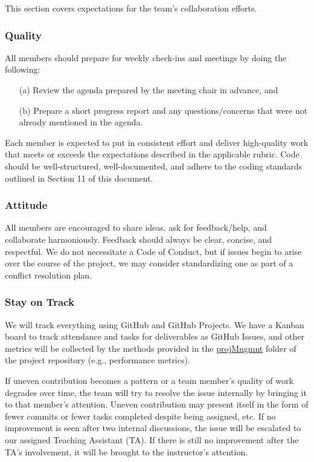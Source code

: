 \documentclass{article}
\begin{document}
This section covers expectations for the team's collaboration efforts.

\subsubsection*{Quality} 

All members should prepare for weekly check-ins and meetings by doing the following:

\begin{itemize}
  \item[(a)] Review the agenda prepared by the meeting chair in advance, and
  \item[(b)] Prepare a short progress report and any questions/concerns that were not
  already mentioned in the agenda.
\end{itemize}

\noindent Each member is expected to put in consistent effort and deliver high-quality work
that meets or exceeds the expectations described in the applicable rubric. Code
should be well-structured, well-documented, and adhere to the coding standards
outlined in Section 11 of this document.

\subsubsection*{Attitude}

All members are encouraged to share ideas, ask for feedback/help, and collaborate
harmoniously. Feedback should always be clear, concise, and respectful. We do not
necessitate a Code of Conduct, but if issues begin to arise over the course of the
project, we may consider standardizing one as part of a conflict resolution plan.

\subsubsection*{Stay on Track}

We will track everything using GitHub and GitHub Projects. We have a Kanban board to
track attendance and tasks for deliverables as GitHub Issues, and other
metrics will be collected by the methods provided in the \href{https://github.com/SumanyaG/Alkalytics/tree/main/docs/projMngmnt}{projMngmnt}
folder of the project repository (e.g., performance metrics).\newline

\noindent If uneven contribution becomes a pattern or a team member’s quality of work degrades
over time, the team will try to resolve the issue internally by bringing it to that
member’s attention. Uneven contribution may present itself in the form of fewer
commits or fewer tasks completed despite being assigned, etc. If no improvement is
seen after two internal discussions, the issue will be escalated to our assigned
Teaching Assistant (TA). If there is still no improvement after the TA's involvement,
it will be brought to the instructor's attention.
\end{document}
